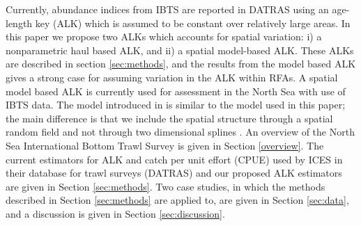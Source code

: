 \documentclass[a4paper 12pt]{article}
\numberwithin{equation}{section}
\begin{document}
Currently, abundance indices from IBTS are reported in DATRAS \citep{datras} using an age-length key (ALK) \citep{fridriksson1934calculation} which is assumed to be constant over relatively large areas. In this paper we propose two ALKs which accounts for spatial variation: i) a nonparametric  haul based ALK, and ii) a spatial model-based ALK. These ALKs are described in section \ref{sec:methods}, and the results from the model based ALK gives a strong case for assuming variation in the ALK within RFAs. %
A spatial model based ALK \citep{berg2012spatial} is currently used for assessment in the North Sea with use of IBTS data. The model introduced in \citet{berg2012spatial} is similar to the model used in this paper; the main difference is that we include the spatial structure through a spatial random field \citep{lindgren2011explicit} and not through two dimensional splines \citep{wood2017generalized}.%
 An  overview of the  North Sea International Bottom Trawl Survey is given in Section \ref{overview}. The current estimators for ALK and catch per unit effort (CPUE) used by ICES in their database for trawl surveys (DATRAS) and our proposed ALK estimators are given in Section \ref{sec:methods}. Two case studies, in which the methods described in Section \ref{sec:methods} are applied to, are given in Section \ref{sec:data}, and a discussion is given in Section \ref{sec:discussion}.%
\end{document}
